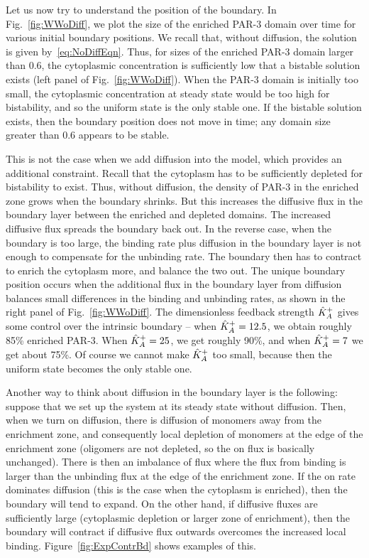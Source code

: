 \documentclass[11pt]{article}
\newcommand{\6}[1]{#1_{\text{6}}}
\newcommand{\3}[1]{#1_{\text{3}}}
\begin{document}
Let us now try to understand the position of the boundary. In Fig.\ \ref{fig:WWoDiff}, we plot the size of the enriched PAR-3 domain over time for various initial boundary positions. We recall that, without diffusion, the solution is given by\ \eqref{eq:NoDiffEqn}. Thus, for sizes of the enriched PAR-3 domain larger than 0.6, the cytoplasmic concentration is sufficiently low that a bistable solution exists (left panel of Fig.\ \ref{fig:WWoDiff}). When the PAR-3 domain is initially too small, the cytoplasmic concentration at steady state would be too high for bistability, and so the uniform state is the only stable one. If the bistable solution exists, then the boundary position does not move in time; any domain size greater than 0.6 appears to be stable.

This is not the case when we add diffusion into the model, which provides an additional constraint. Recall that the cytoplasm has to be sufficiently depleted for bistability to exist. Thus, without diffusion, the density of PAR-3 in the enriched zone grows when the boundary shrinks. But this increases the diffusive flux in the boundary layer between the enriched and depleted domains. The increased diffusive flux spreads the boundary back out. In the reverse case, when the boundary is too large, the binding rate plus diffusion in the boundary layer is not enough to compensate for the unbinding rate. The boundary then has to contract to enrich the cytoplasm more, and balance the two out. The unique boundary position occurs when the additional flux in the boundary layer from diffusion balances small differences in the binding and unbinding rates, as shown in the right panel of Fig.\ \ref{fig:WWoDiff}. The dimensionless feedback strength $\hat{K}^\text{+}_A$ gives some control over the intrinsic boundary -- when $\hat{K}^\text{+}_A=12.5$, we obtain roughly 85\% enriched PAR-3. When $\hat{K}^\text{+}_A=25$, we get roughly 90\%, and when $\hat{K}^\text{+}_A=7$ we get about 75\%. Of course we cannot make $\hat{K}^\text{+}_A$ too small, because then the uniform state becomes the only stable one.

Another way to think about diffusion in the boundary layer is the following: suppose that we set up the system at its steady state without diffusion. Then, when we turn on diffusion, there is diffusion of monomers away from the enrichment zone, and consequently local depletion of monomers at the edge of the enrichment zone (oligomers are not depleted, so the on flux is basically unchanged). There is then an imbalance of flux where the flux from binding is larger than the unbinding flux at the edge of the enrichment zone. If the on rate dominates diffusion (this is the case when the cytoplasm is enriched), then the boundary will tend to expand. On the other hand, if diffusive fluxes are sufficiently large (cytoplasmic depletion or larger zone of enrichment), then the boundary will contract if diffusive flux outwards overcomes the increased local binding. Figure\ \ref{fig:ExpContrBd} shows examples of this.
\end{document}
